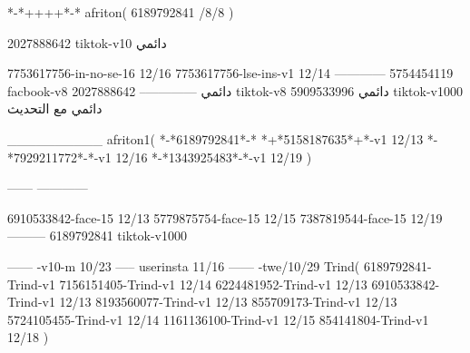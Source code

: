 *-*++++*-*
afriton(
6189792841 /8/8
)

2027888642 tiktok-v10
دائمي

7753617756-in-no-se-16 12/16
7753617756-lse-ins-v1 12/14
------------
5754454119 facbook-v8
دائمي
--------------
2027888642 tiktok-v8
دائمي
5909533996 tiktok-v1000
دائمي مع التحديث

__________
afriton1(
*-*6189792841*-*
*+*5158187635*+*-v1 12/13
*-*7929211772*-*-v1 12/16
*-*1343925483*-*-v1 12/19
)

------
------------


6910533842-face-15 12/13
5779875754-face-15 12/15
7387819544-face-15 12/19
---------
6189792841 tiktok-v1000
 
------
-v10-m 10/23
-----
userinsta 11/16
------
-twe/10/29
Trind(
6189792841-Trind-v1 
7156151405-Trind-v1 12/14
6224481952-Trind-v1 12/13
6910533842-Trind-v1 12/13
8193560077-Trind-v1 12/13
855709173-Trind-v1 12/13
5724105455-Trind-v1 12/14
1161136100-Trind-v1 12/15
854141804-Trind-v1 12/18
)
